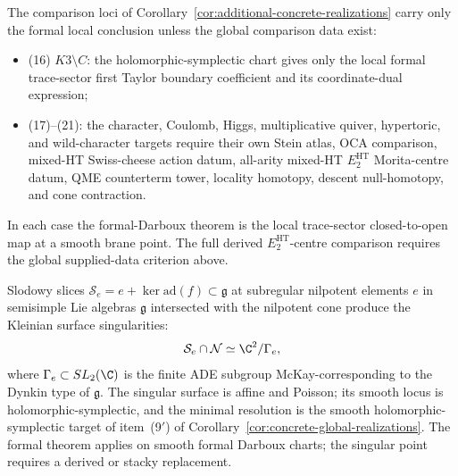 \begin{rmk}\label{rmk:physical-interpretations}
The comparison loci of
Corollary~\ref{cor:additional-concrete-realizations} carry only the
formal local conclusion unless the global comparison data exist:
\begin{itemize}
  \item (16) \(K3\setminus C\): the holomorphic-symplectic chart gives
        only the local formal trace-sector first Taylor boundary
        coefficient and its coordinate-dual expression;
  \item (17)--(21): the character, Coulomb, Higgs, multiplicative
        quiver, hypertoric, and wild-character targets require their
        own Stein atlas, OCA comparison, mixed-HT Swiss-cheese action
        datum, all-arity mixed-HT \(E_2^{\mathrm{HT}}\) Morita-centre
        datum, QME counterterm tower,
        locality homotopy, descent null-homotopy, and cone contraction.
\end{itemize}
In each case the formal-Darboux theorem is the local trace-sector
closed-to-open map at a smooth brane point.  The full
derived \(E_2^{\mathrm{HT}}\)-centre comparison requires the global
supplied-data criterion above.
\end{rmk}

\begin{rmk}\label{rmk:slodowy-slices}
Slodowy slices \(\mathcal S_e=e+\ker\mathrm{ad}(f)\subset\mathfrak g\)
at subregular nilpotent elements $e$ in semisimple Lie algebras
$\mathfrak g$ intersected with the nilpotent cone produce the
Kleinian surface singularities:
\[
  \mathcal S_e\cap\mathcal N \simeq \C^2/\Gamma_e ,
\]
where \(\Gamma_e\subset SL_2(\C)\) is the finite ADE subgroup
McKay-corresponding to the Dynkin type of \(\mathfrak g\).  The
singular surface is affine and Poisson; its smooth locus is
holomorphic-symplectic, and the minimal resolution is the smooth
holomorphic-symplectic target of item~(9$'$) of
Corollary~\ref{cor:concrete-global-realizations}.  The formal theorem
applies on smooth formal Darboux charts; the singular point requires a
derived or stacky replacement.
\end{rmk}

